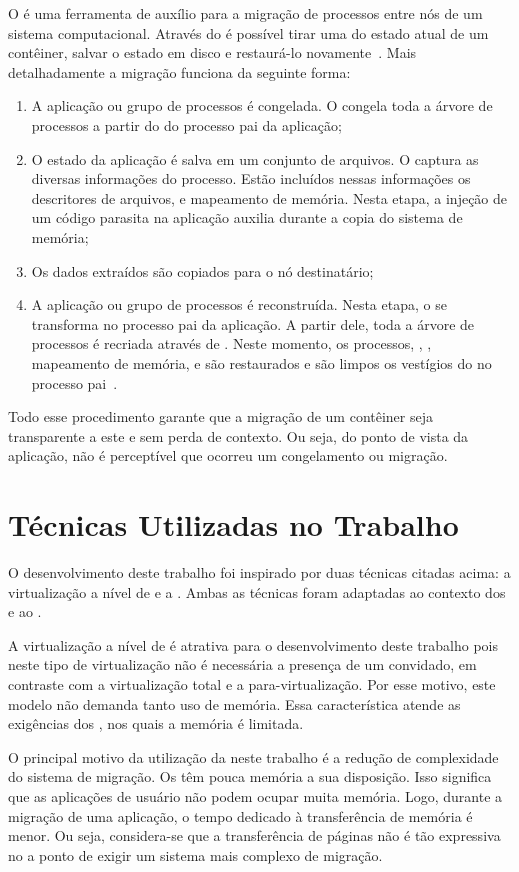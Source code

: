 O \criu é uma ferramenta de auxílio para a migração de processos entre nós de um sistema computacional. Através do \criu é possível tirar uma \snapshot do estado atual de um contêiner, salvar o estado em disco e restaurá-lo novamente~\cite{venkatesh2019fast}. Mais detalhadamente a migração funciona da seguinte forma:
\begin{enumerate}[label=(\roman*)]
    \item A aplicação ou grupo de processos é congelada. O \criu congela toda a árvore de processos a partir do \pid do processo pai da aplicação;
    \item O estado da aplicação é salva em um conjunto de arquivos. O \criu captura as diversas informações do processo. Estão incluídos nessas informações os descritores de arquivos, \pipes e mapeamento de memória. Nesta etapa, a injeção de um código parasita na aplicação auxilia durante a copia do sistema de memória;
    \item Os dados extraídos são copiados para o nó destinatário;
    \item A aplicação ou grupo de processos é reconstruída. Nesta etapa, o \criu se transforma no processo pai da aplicação. A partir dele, toda a árvore de processos é recriada através de \forks. Neste momento, os processos, \namespaces, \cgroups, mapeamento de memória, \timers e \threads são restaurados e são limpos os vestígios do \criu no processo pai~\cite{dash2022understanding}.
\end{enumerate}

Todo esse procedimento garante que a migração de um contêiner seja transparente a este e sem perda de contexto. Ou seja, do ponto de vista da aplicação, não é perceptível que ocorreu um congelamento ou migração.



\section{Técnicas Utilizadas no Trabalho}

O desenvolvimento deste trabalho foi inspirado por duas técnicas citadas acima: a virtualização a nível de \so e a \precopymigration. Ambas as técnicas foram adaptadas ao contexto dos \lws e ao \nanvix.

A virtualização a nível de \so é atrativa para o desenvolvimento deste trabalho pois neste tipo de virtualização não é necessária a presença de um \so convidado, em contraste com a virtualização total e a para-virtualização. Por esse motivo, este modelo não demanda tanto uso de memória. Essa característica atende as exigências dos \lws, nos quais a memória é limitada.

O principal motivo da utilização da \precopymigration neste trabalho é a redução de complexidade do sistema de migração. Os \lws têm pouca memória a sua disposição. Isso significa que as aplicações de usuário não podem ocupar muita memória. Logo, durante a migração de uma aplicação, o tempo dedicado à transferência de memória é menor. Ou seja, considera-se que a transferência de páginas não é tão expressiva no \downtime a ponto de exigir um sistema mais complexo de migração.


